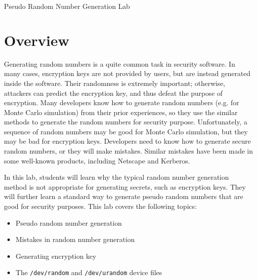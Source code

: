 




\newcommand{\randFigs}{./Figs/../Random_Number/Figures}




\begin{center}
{\LARGE Pseudo Random Number Generation Lab}
\end{center}




\section{Overview}

Generating random numbers is a quite common task in security software. 
In many cases, encryption keys are not provided by users, but are instead 
generated inside the software. Their randomness is extremely important;
otherwise, attackers can predict the encryption key, and thus defeat the 
purpose of encryption. Many developers know how to generate random
numbers (e.g. for Monte Carlo simulation)
from their prior experiences, so they use the similar methods
to generate the random numbers for security purpose. Unfortunately,
a sequence of random numbers may be good for Monte Carlo simulation, but
they may be bad for encryption keys. Developers need to know how to
generate secure random numbers, or they will make mistakes. Similar
mistakes have been made in some well-known products, including
Netscape and Kerberos. 

In this lab, students will learn why the typical 
random number generation method is not appropriate for generating 
secrets, such as encryption keys. They will further learn 
a standard way to generate pseudo random numbers that are good for security purposes.
This lab covers the following topics:

\begin{itemize}[noitemsep]
\item Pseudo random number generation
\item Mistakes in random number generation
\item Generating encryption key
\item The \texttt{/dev/random} and \texttt{/dev/urandom} device files  
\end{itemize}


